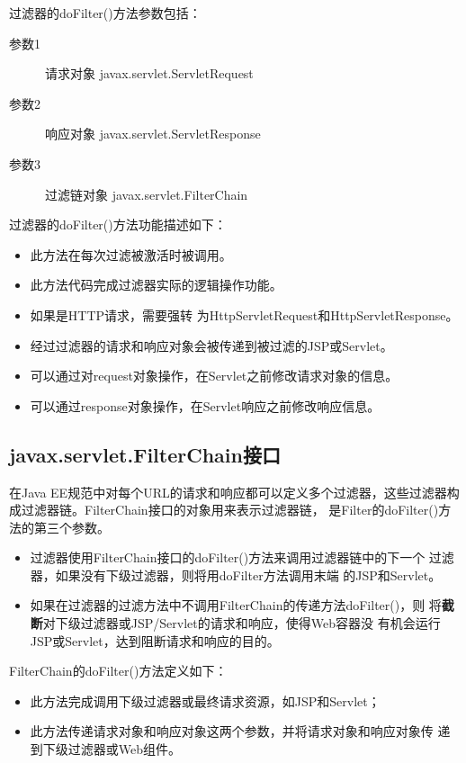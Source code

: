 过滤器的doFilter()方法参数包括：

\begin{description}
\item[参数1] 请求对象 javax.servlet.ServletRequest
\item[参数2] 响应对象 javax.servlet.ServletResponse
\item[参数3] 过滤链对象 javax.servlet.FilterChain
\end{description}

过滤器的doFilter()方法功能描述如下：

\begin{itemize}
\item 此方法在每次过滤被激活时被调用。
\item 此方法代码完成过滤器实际的逻辑操作功能。
\item 如果是HTTP请求，需要强转
  为HttpServletRequest和HttpServletResponse。
\item 经过过滤器的请求和响应对象会被传递到被过滤的JSP或Servlet。
\item 可以通过对request对象操作，在Servlet之前修改请求对象的信息。
\item 可以通过response对象操作，在Servlet响应之前修改响应信息。
\end{itemize}

\subsection{javax.servlet.FilterChain接口} 

在Java EE规范中对每个URL的请求和响应都可以定义多个过滤器，这些过滤器构
成过滤器链。FilterChain接口的对象用来表示过滤器链，
是Filter的doFilter()方法的第三个参数。

\begin{itemize}
\item 过滤器使用FilterChain接口的doFilter()方法来调用过滤器链中的下一个
  过滤器，如果没有下级过滤器，则将用doFilter方法调用末端
  的JSP和Servlet。
\item 如果在过滤器的过滤方法中不调用FilterChain的传递方法doFilter()，则
  将{\bf\Red 截断}对下级过滤器或JSP/Servlet的请求和响应，使得Web容器没
  有机会运行JSP或Servlet，达到阻断请求和响应的目的。
\end{itemize}

FilterChain的doFilter()方法定义如下：


\begin{itemize}
\item 此方法完成调用下级过滤器或最终请求资源，如JSP和Servlet；
\item 此方法传递请求对象和响应对象这两个参数，并将请求对象和响应对象传
  递到下级过滤器或Web组件。
\end{itemize}

